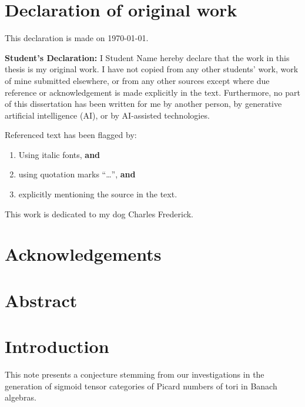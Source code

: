 \documentclass[12pt, oneside]{book}
\theoremstyle{plain}
\theoremstyle{definition}
\begin{document}
\chapter*{Declaration of original work}
\begin{flushright}
This declaration is made on \today.
\end{flushright}


{\bf Student's Declaration:}
I Student Name hereby declare that the work in this thesis 
is my original work. I have not copied from any other students' work, 
work of mine submitted elsewhere,  or from any other sources except where due 
reference or acknowledgement is made explicitly in the text. 
Furthermore, no part of this dissertation has been written for me by another person,
by generative artificial intelligence (AI), or by AI-assisted technologies.  
 



Referenced text has been flagged by:
\begin{enumerate}
\item Using italic fonts, {\bf and} %
\item using quotation marks ``\ldots '', {\bf and}
\item explicitly mentioning the source in the text.
\end{enumerate}


\newpage

\thispagestyle{empty}
        \begin{flushright}
                This work is dedicated to my dog Charles Frederick.
        \end{flushright}
\null



\chapter*{Acknowledgements}
\lipsum[100] %

\chapter*{Abstract}
\lipsum[100]%

\tableofcontents

\chapter{Introduction}
This note presents a conjecture stemming from our investigations in the generation of sigmoid tensor categories of Picard numbers of tori in Banach algebras.
\lipsum[20]
 
\end{document}
